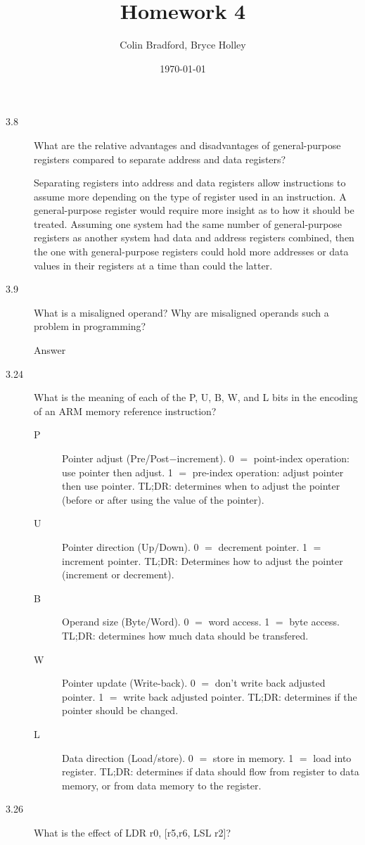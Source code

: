 \documentclass[letterpaper,10pt,titlepage]{article}
\def\name{Colin Bradford, Bryce Holley}
\begin{document}
\title{Homework 4}
\author{\name}
\date{\today}
\maketitle
\begin{description}
    \item[3.8] What are the relative advantages and disadvantages of general-purpose registers compared to separate address and data registers?
    
    Separating registers into address and data registers allow instructions to assume more depending on the type of register used in an instruction. A general-purpose register would require more insight as to how it should be treated. Assuming one system had the same number of general-purpose registers as another system had data and address registers combined, then the one with general-purpose registers could hold more addresses or data values in their registers at a time than could the latter.
    \item[3.9] What is a misaligned operand? Why are misaligned operands such a problem in programming?
    
    Answer
    \item[3.24] What is the meaning of each of the P, U, B, W, and L bits in the encoding of an ARM memory reference instruction?
    \begin{description}
        \item[P] Pointer adjust (Pre/Post$-$increment). 0 $=$ point-index operation: use pointer then adjust. 1 $=$ pre-index operation: adjust pointer then use pointer. TL;DR: determines when to adjust the pointer (before or after using the value of the pointer).
        \item[U] Pointer direction (Up/Down). 0 $=$ decrement pointer. 1 $=$ increment pointer. TL;DR: Determines how to adjust the pointer (increment or decrement).
        \item[B] Operand size (Byte/Word). 0 $=$ word access. 1 $=$ byte access. TL;DR: determines how much data should be transfered.
        \item[W] Pointer update (Write-back). 0 $=$ don't write back adjusted pointer. 1 $=$ write back adjusted pointer. TL;DR: determines if the pointer should be changed.
        \item[L] Data direction (Load/store). 0 $=$ store in memory. 1 $=$ load into register. TL;DR: determines if data should flow from register to data memory, or from data memory to the register.
    \end{description}
    \item[3.26] What is the effect of LDR r0, [r5,r6, LSL r2]?
    

\end{description}
\end{document}
